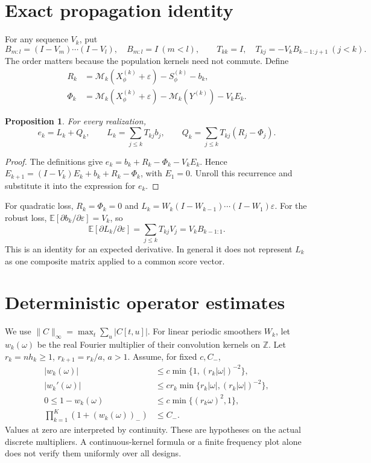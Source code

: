 \documentclass[11pt]{article}
\newcommand{\E}{\mathbb E}
\newcommand{\norm}[1]{\lVert #1\rVert}
\newtheorem{proposition}{Proposition}
\theoremstyle{remark}
\begin{document}
\section{Exact propagation identity}
For any sequence \(V_k\), put
\[
 B_{m:l}=(I-V_m)\cdots(I-V_l),\quad B_{m:l}=I\ (m<l),\qquad
 T_{kk}=I,\quad T_{kj}=-V_kB_{k-1:j+1}\ (j<k).
\]
The order matters because the population kernels need not commute. Define
\begin{align*}
 R_k&=\mathcal M_k(X_\phi^{(k)}+\varepsilon)-S_\phi^{(k)}-b_k,\\
 \Phi_k&=\mathcal M_k(X_\phi^{(k)}+\varepsilon)
            -\mathcal M_k(Y^{(k)})-V_kE_k.
\end{align*}
\begin{proposition}\label{prop:identity}
For every realization,
\[
 e_k=L_k+Q_k,\qquad L_k=\sum_{j\le k}T_{kj}b_j,\qquad
 Q_k=\sum_{j\le k}T_{kj}(R_j-\Phi_j).
\]
\end{proposition}
\begin{proof}
The definitions give \(e_k=b_k+R_k-\Phi_k-V_kE_k\). Hence
\(E_{k+1}=(I-V_k)E_k+b_k+R_k-\Phi_k\), with \(E_1=0\).
Unroll this recurrence and substitute it into the expression for \(e_k\).
\end{proof}
For quadratic loss, \(R_k=\Phi_k=0\) and
\(L_k=W_k(I-W_{k-1})\cdots(I-W_1)\varepsilon\).
For the robust loss, \(\E[\partial b_k/\partial\varepsilon]=V_k\), so
\[
 \E[\partial L_k/\partial\varepsilon]
 =\sum_{j\le k}T_{kj}V_j=V_kB_{k-1:1}.
\]
This is an identity for an expected derivative. In general it does not
represent \(L_k\) as one composite matrix applied to a common score vector.

\section{Deterministic operator estimates}
We use \(\norm{C}_\infty=\max_t\sum_u|C[t,u]|\).
For linear periodic smoothers \(W_k\), let \(w_k(\omega)\) be the real Fourier
multiplier of their convolution kernels on \(\mathbb Z\). Let
\(r_k=nh_k\ge1\), \(r_{k+1}=r_k/a\), \(a>1\). Assume, for fixed \(c,C_-\),
\begin{align}
 |w_k(\omega)|&\le c\min\{1,(r_k|\omega|)^{-2}\},\label{eq:K1}\\
 |w_k'(\omega)|&\le cr_k\min\{r_k|\omega|,(r_k|\omega|)^{-2}\},\label{eq:K2}\\
 0\le1-w_k(\omega)&\le c\min\{(r_k\omega)^2,1\},\label{eq:K3}\\
 \prod_{k=1}^K(1+(w_k(\omega))_-)&\le C_- .\label{eq:K4}
\end{align}
Values at zero are interpreted by continuity. These are hypotheses on the
actual discrete multipliers. A continuous-kernel formula or a finite
frequency plot alone does not verify them uniformly over all designs.
\end{document}
